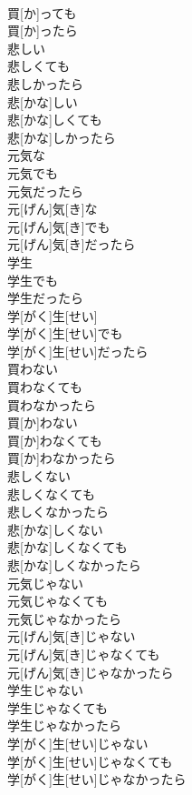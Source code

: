 \documentclass[8pt]{extreport}
\begin{document}
\begin{CJK}{UTF8}{min}
\\	買[か]っても 
\\	買[か]ったら
\\	悲しい 
\\	悲しくても 
\\	悲しかったら	
\\	悲[かな]しい 
\\	悲[かな]しくても 
\\	悲[かな]しかったら
\\	元気な 
\\	元気でも 
\\	元気だったら	
\\	元[げん]気[き]な 
\\	元[げん]気[き]でも 
\\	元[げん]気[き]だったら
\\	学生 
\\	学生でも 
\\	学生だったら	
\\	学[がく]生[せい] 
\\	学[がく]生[せい]でも 
\\	学[がく]生[せい]だったら
\\	買わない 
\\	買わなくても 
\\	買わなかったら	
\\	買[か]わない 
\\	買[か]わなくても 
\\	買[か]わなかったら
\\	悲しくない 
\\	悲しくなくても 
\\	悲しくなかったら	
\\	悲[かな]しくない 
\\	悲[かな]しくなくても 
\\	悲[かな]しくなかったら
\\	元気じゃない 
\\	元気じゃなくても 
\\	元気じゃなかったら	
\\	元[げん]気[き]じゃない 
\\	元[げん]気[き]じゃなくても 
\\	元[げん]気[き]じゃなかったら
\\	学生じゃない 
\\	学生じゃなくても 
\\	学生じゃなかったら	
\\	学[がく]生[せい]じゃない 
\\	学[がく]生[せい]じゃなくても 
\\	学[がく]生[せい]じゃなかったら

\end{CJK}
\end{document}
